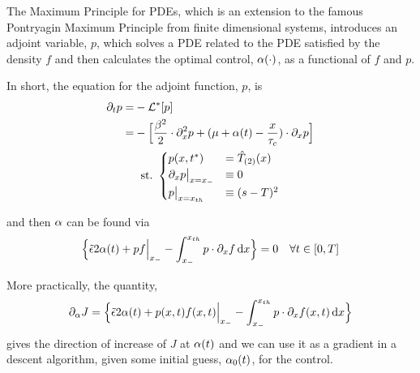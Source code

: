 \documentclass{article}
\begin{document}
The Maximum Principle for PDEs, which is an extension to the famous Pontryagin
Maximum Principle from finite dimensional systems, introduces an adjoint
variable, $p$, which solves a PDE related to the PDE satisfied by the density
$f$ and then calculates the optimal control, ${\alpha}(\cdot)$, as a functional of $f$
and $p$.

In short, the equation for the adjoint function, $p$, is
\begin{equation}
\begin{gathered}
\begin{aligned}
{\partial}_t p =& - { { \mathcal{L} }^* }[p]
\\
		=&
			- \Big[ \frac{{\beta}^2 }{2}\cdot {\partial}^2_x p +
			({\mu } + {\alpha}(t)- \frac{x}{{ \tau_{c} }})  \cdot {\partial}_x p \Big]
\end{aligned}
\\
{ \textrm{st.\ } }
\begin{cases}
	p(x,{ t^* }) &= { \hat{T}_{(2)} }(x)
	\\
	{\partial}_x p  \big|_{x={ x_{-} }} &\equiv 0
	\\
	p \big|_{x={ x_{th} }} &\equiv (s-T)^2
\end{cases}
\label{eq:adjoint_pde_OU}
\end{gathered}
\end{equation}

and then ${\alpha}$ can be found via
\begin{equation}
\Big\{
 \tilde{{\epsilon}}  2 {\alpha}(t)
+ p f \Big|_{ x_{-} }
- \int _{ x_{-} }^{ x_{th} } p \cdot {\partial}_x f \, \mathrm{d} x
\Big\} = 0
\quad \forall t \in [0,T]
\label{eq:J_necessary_condition}
\end{equation}

More practically, the quantity,
$${\partial}_{\alpha} J =  \Big\{
 \tilde{{\epsilon}}  2 {\alpha}(t)
+ p(x,t) f(x,t) \Big|_{ x_{-} }
- \int _{ x_{-} }^{ x_{th} } p \cdot {\partial}_x f(x,t) \, \mathrm{d} x
\Big\}
$$
gives the direction of increase of $J$ at ${\alpha}(t)$
and we can use it as a gradient in a descent algorithm, given some initial
guess, ${\alpha}_0(t)$, for the control.
\end{document}
